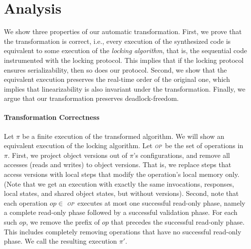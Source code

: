 \newcommand{\op}{\emph{\textsc{op}}}
\newcommand{\opt}{\textsc{opt}}

\section{Analysis}
\label{sec:proof}

We show  three properties of our automatic transformation. First, we prove that the  transformation is correct, i.e., 
every execution of the  synthesized code is equivalent to some execution of the \emph{locking algorithm}, that is, the
sequential code instrumented with the locking protocol.
This implies that if the locking protocol ensures serializability, then so does our protocol.
Second, we show that the equivalent execution preserves the real-time order of the original one, 
which implies that linearizability is also invariant under the transformation.
Finally, we argue that our transformation preserves deadlock-freedom.

\paragraph{Transformation Correctness}

Let $\pi$ be a finite execution of the transformed algorithm. We will show an equivalent execution of the locking algorithm.
Let \op\ be the set of operations in $\pi$.
First, we project object versions out of $\pi$'s configurations, and remove all accesses (reads and writes) to object versions.
That is, we replace steps that access versions with local steps that modify the operation's local memory only.
(Note that we get an execution with exactly the same invocations, responses, local states, and shared object states, but without 
versions). 
Second, note that each operation $op \in$ \op\ executes at most one successful read-only
phase, namely a complete read-only phase followed by a successful validation phase.
For each such $op$, we remove the prefix of $op$ that precedes the successful read-only phase.
This includes completely removing operations that have no successful read-only phase.
We call the resulting execution $\pi'$.

